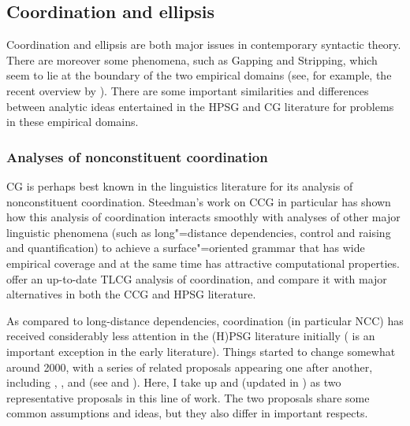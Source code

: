 \documentclass[output=paper,biblatex,babelshorthands,newtxmath,draftmode,colorlinks,citecolor=brown]{langscibook}
\begin{document}
\subsection{Coordination and ellipsis}

Coordination and ellipsis are both major issues in contemporary
syntactic theory. There are moreover some phenomena, such as Gapping
and Stripping, which seem to lie at the boundary of the two
empirical domains (see,  for example,  the recent overview
by \citealt{johnson-ellipsis-handbook}). There are some important similarities and
differences between analytic ideas entertained in the HPSG and CG
literature for problems in these empirical domains.


\subsubsection{Analyses of nonconstituent coordination  \label{NCCcomparison}}

CG is perhaps best known in the linguistics literature for its
analysis of nonconstituent coordination. Steedman's work on CCG
\citep{Steedman97a,Steedman2000a-u,steedman2012} in particular has
shown how this analysis of coordination interacts smoothly with
analyses of other major linguistic phenomena (such as long"=distance
dependencies, control and raising and quantification) to achieve a
surface"=oriented grammar that has wide empirical coverage and at the
same time has attractive computational properties.
\citet{kubota-levine-coord,KubotaLevineBook} offer an up-to-date TLCG
analysis of coordination, and compare it with major alternatives in
both the CCG and HPSG literature.


As compared to long-distance dependencies, coordination (in particular
NCC) has received considerably less attention in the (H)PSG literature
initially (\citealt{sgww} is an important exception in the early
literature). Things started to change somewhat around 2000, with a
series of related proposals appearing one after another, including
\citet{Yatabe2001a}, \citet{BS2004a}, \citet{chaves07} and
\citet{Crysmann2003c} (see
 and ). Here, I take up
\citet{BS2004a} and \citet{Yatabe2001a} (updated in
\citealt{yatabe-tam2017}) as two representative proposals in this line
of work. The two proposals share some common assumptions and ideas,
but they also differ in important respects.
\end{document}
